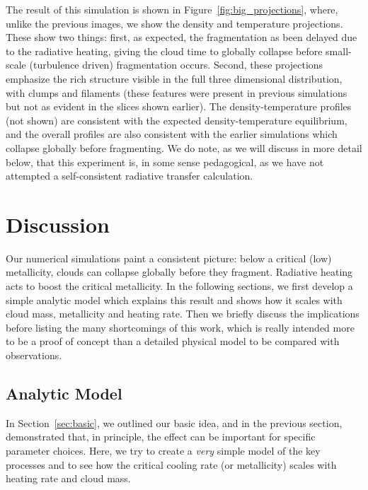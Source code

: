 \documentclass[useAMS,usenatbib]{mn2e}
\begin{document}
The result of this simulation is shown in Figure~\ref{fig:big_projections}, where, unlike the previous images, we show the density and temperature projections.  These show two things: first, as expected, the fragmentation as been delayed due to the radiative heating, giving the cloud time to globally collapse before small-scale (turbulence driven) fragmentation occurs.  Second, these projections emphasize the rich structure visible in the full three dimensional distribution, with clumps and filaments (these features were present in previous simulations but not as evident in the slices shown earlier).  The density-temperature profiles (not shown) are consistent with the expected density-temperature equilibrium, and the overall profiles are also consistent with the earlier simulations which collapse globally before fragmenting.  We do note, as we will discuss in more detail below, that this experiment is, in some sense pedagogical, as we have not attempted a self-consistent radiative transfer calculation.





% 
\section{Discussion}
\label{sec:discussion}

Our numerical simulations paint a consistent picture: below a critical (low) metallicity, clouds can collapse globally before they fragment.  Radiative heating acts to boost the critical metallicity.  In the following sections, we first develop a simple analytic model which explains this result and shows how it scales with cloud mass, metallicity and heating rate.  Then we briefly discuss the implications before listing the many shortcomings of this work, which is really intended more to be a proof of concept than a detailed physical model to be compared with observations.

\subsection{Analytic Model}

In Section~\ref{sec:basic}, we outlined our basic idea, and in the previous section, demonstrated that, in principle, the effect can be important for specific parameter choices.  Here, we try to create a {\it very} simple model of the key processes and to see how the critical cooling rate (or metallicity) scales with heating rate and cloud mass.
\end{document}
